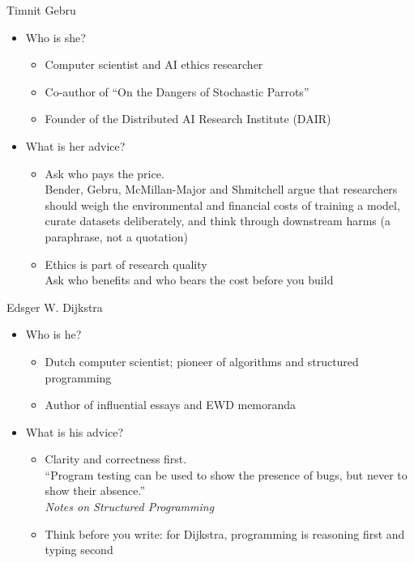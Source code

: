 \documentclass[aspectratio=169]{beamer}
\begin{document}
\begin{frame}{Timnit Gebru}
  \begin{itemize}
    \item Who is she?
      \begin{itemize}
        \item Computer scientist and AI ethics researcher
        \item Co-author of ``On the Dangers of Stochastic Parrots'' \citep{bender:stochastic-parrots}
        \item Founder of the Distributed AI Research Institute (DAIR)
      \end{itemize}

    \item What is her advice?
      \begin{itemize}
        \item Ask who pays the price.\\
          Bender, Gebru, McMillan-Major and Shmitchell argue that researchers
          should weigh the environmental and financial costs of training a
          model, curate datasets deliberately, and think through downstream
          harms \citep{bender:stochastic-parrots} (a paraphrase, not a quotation)

        \item Ethics is part of research quality\\
          Ask who benefits and who bears the cost before you build

      \end{itemize}
  \end{itemize}
\end{frame}

\begin{frame}{Edsger W. Dijkstra}
  \begin{itemize}
    \item Who is he?
      \begin{itemize}
        \item Dutch computer scientist; pioneer of algorithms and structured programming
        \item Author of influential essays and EWD memoranda
      \end{itemize}

    \item What is his advice?
      \begin{itemize}
        \item Clarity and correctness first.\\
          ``Program testing can be used to show the presence of bugs, but never to show their absence.''%
          \\ \hfill \textit{Notes on Structured Programming} \citep[\S3]{dijkstra:structured}

        \item Think before you write: for Dijkstra, programming is reasoning first and typing second
      \end{itemize}
  \end{itemize}
\end{frame}
\end{document}
